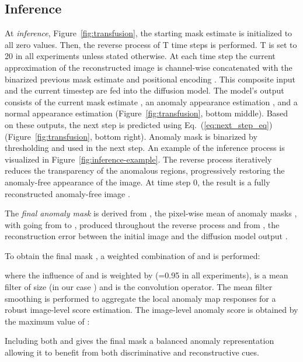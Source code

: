 \documentclass[10pt,twocolumn,letterpaper]{article}
\begin{document}
\subsection{Inference}
\label{ch:final_mask}


At \textit{inference}, Figure~\ref{fig:transfusion}, the starting mask estimate is initialized to all zero values.
Then, the reverse process of T time steps is performed. T is set to 20 in all experiments unless stated otherwise. At each time step  the current approximation of the reconstructed image  is channel-wise concatenated with the binarized previous mask estimate  and positional encoding . This composite input and the current timestep  are fed into the diffusion model. The model's output consists of the current mask estimate , an anomaly appearance estimation , and a normal appearance estimation  (Figure~\ref{fig:transfusion}, bottom middle). Based on these outputs, the next step   is predicted using Eq.~(\ref{eq:next_step_eq}) (Figure~\ref{fig:transfusion}, bottom right). Anomaly mask  is binarized by thresholding and used in the next step. An example of the inference process is visualized in Figure~\ref{fig:inference-example}. The reverse process iteratively reduces the transparency of the anomalous regions, progressively restoring the anomaly-free appearance of the image. At time step 0, the result is a fully reconstructed anomaly-free image .


The \textit{final anomaly mask}  is derived from , the pixel-wise mean of anomaly masks , with  going from  to , produced throughout the reverse process and from , the reconstruction error between the initial image  and the diffusion model output .

To obtain the final mask , a weighted combination of  and  is performed:

where the influence of  and  is weighted by  (=0.95 in all experiments),  is a mean filter of size  (in our case ) and  is the convolution operator. The mean filter smoothing is performed to aggregate the local anomaly map responses for a robust image-level score estimation. The image-level anomaly score  is obtained by the maximum value of :


Including both  and  gives the final mask  a balanced anomaly representation allowing it to benefit from both discriminative and reconstructive cues.
\end{document}
